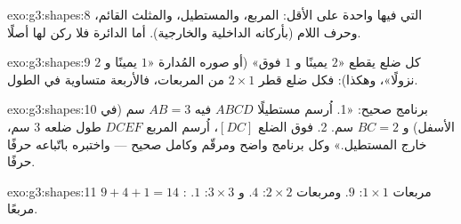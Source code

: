 \begin{solution}{exo:g3:shapes:8}
التي فيها  واحدة على الأقل: المربع، والمستطيل،
والمثلث القائم، وحرف اللام (بأركانه الداخلية والخارجية). أما
الدائرة فلا ركن لها أصلًا.
\end{solution}

\begin{solution}{exo:g3:shapes:9}
كل ضلع يقطع «$2$ يمينًا و $1$ فوق» (أو صوره المُدارة
«$1$ يمينًا و $2$ نزولًا»، وهكذا): فكل ضلع قطر 
$2 \times 1$ من المربعات، فالأربعة متساوية في الطول.
\end{solution}

\begin{solution}{exo:g3:shapes:10}
برنامج صحيح: «1. اُرسم مستطيلًا $ABCD$ فيه $AB = 3$ سم
(في الأسفل) و $BC = 2$ سم. 2. فوق الضلع $[DC]$، اُرسم
المربع $DCEF$ طول ضلعه $3$ سم، خارج المستطيل.» وكل برنامج
واضح ومرقّم وكامل صحيح --- واختبره باتّباعه حرفًا
حرفًا.
\end{solution}

\begin{solution}{exo:g3:shapes:11}
مربعات $1 \times 1$: $9$. ومربعات $2 \times 2$: $4$.
و $3 \times 3$: $1$. : $9 + 4 + 1 = 14$ مربعًا.
\end{solution}
